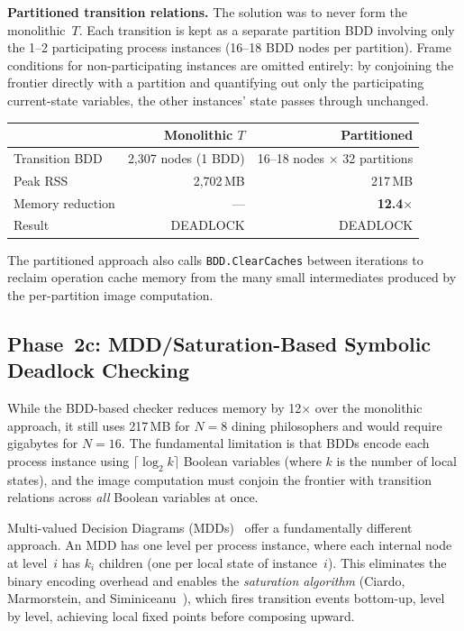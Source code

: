 \documentclass[11pt]{article}
\begin{document}
\textbf{Partitioned transition relations.}
The solution was to never form the monolithic~$T$.  Each transition
is kept as a separate partition BDD involving only the 1--2
participating process instances (16--18 BDD nodes per partition).
Frame conditions for non-participating instances are omitted entirely:
by conjoining the frontier directly with a partition and quantifying
out only the participating current-state variables, the other
instances' state passes through unchanged.

\begin{center}
\begin{tabular}{lrr}
\toprule
& \textbf{Monolithic $T$} & \textbf{Partitioned} \\
\midrule
Transition BDD    & 2,307 nodes (1 BDD)   & 16--18 nodes $\times$ 32 partitions \\
Peak RSS          & 2,702\,MB             & 217\,MB \\
Memory reduction  & ---                   & \textbf{12.4$\times$} \\
Result            & DEADLOCK              & DEADLOCK \\
\bottomrule
\end{tabular}
\end{center}

The partitioned approach also calls \texttt{BDD.ClearCaches} between
iterations to reclaim operation cache memory from the many small
intermediates produced by the per-partition image computation.

\subsection{Phase~2c: MDD/Saturation-Based Symbolic Deadlock Checking}

While the BDD-based checker reduces memory by 12$\times$ over the
monolithic approach, it still uses 217\,MB for $N = 8$ dining
philosophers and would require gigabytes for $N = 16$.  The fundamental
limitation is that BDDs encode each process instance using
$\lceil \log_2 k \rceil$ Boolean variables (where $k$ is the number of
local states), and the image computation must conjoin the frontier with
transition relations across \emph{all} Boolean variables at once.

Multi-valued Decision Diagrams (MDDs)~\cite{ciardo2001} offer a
fundamentally different approach.  An MDD has one level per process
instance, where each internal node at level~$i$ has $k_i$ children
(one per local state of instance~$i$).  This eliminates the binary
encoding overhead and enables the \emph{saturation algorithm}
(Ciardo, Marmorstein, and Siminiceanu~\cite{ciardo2001}), which fires
transition events bottom-up, level by level, achieving local fixed
points before composing upward.
\end{document}
